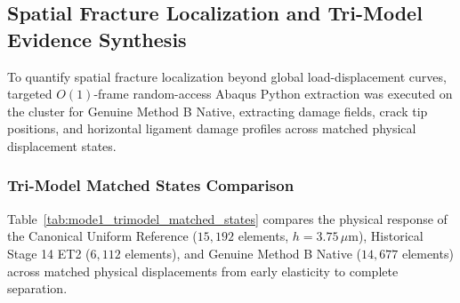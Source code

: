 \subsection{Spatial Fracture Localization and Tri-Model Evidence Synthesis}
\label{subsec:gate6b_spatial_localization}

To quantify spatial fracture localization beyond global load-displacement curves, targeted $O(1)$-frame random-access Abaqus Python extraction was executed on the cluster for Genuine Method B Native, extracting damage fields, crack tip positions, and horizontal ligament damage profiles across matched physical displacement states.

\subsubsection{Tri-Model Matched States Comparison}
Table~\ref{tab:mode1_trimodel_matched_states} compares the physical response of the Canonical Uniform Reference ($15{,}192$ elements, $h = 3.75\,\mu\mathrm{m}$), Historical Stage 14 ET2 ($6{,}112$ elements), and Genuine Method B Native ($14{,}677$ elements) across matched physical displacements from early elasticity to complete separation.

